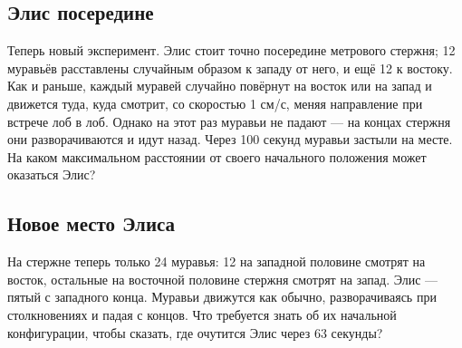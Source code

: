 \subsection*{Элис посередине}

Теперь новый эксперимент.
Элис стоит точно посередине метрового стержня; 12 муравьёв расставлены случайным образом к западу от него, и ещё 12 к востоку.
Как и раньше, каждый муравей случайно повёрнут на восток или на запад и движется туда, куда смотрит, со скоростью 1 см/с, меняя направление при встрече лоб в лоб.
Однако на этот раз муравьи не падают ---
на концах стержня они разворачиваются и идут назад.
Через 100 секунд муравьи застыли на месте.
На каком максимальном расстоянии от своего начального положения может оказаться Элис?

\subsection*{Новое место Элиса}

На стержне теперь только 24 муравья:
12 на западной половине смотрят на восток,
остальные на восточной половине стержня смотрят на запад.
Элис --- пятый с западного конца.
Муравьи движутся как обычно, разворачиваясь при столкновениях и падая с концов.
Что требуется знать об их начальной конфигурации, чтобы сказать, где очутится Элис через 63 секунды?
